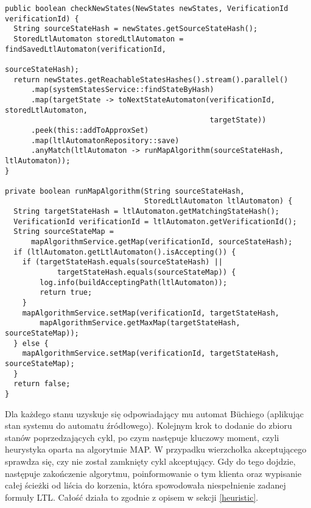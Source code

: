 \begin{minipage}{\linewidth}
\begin{lstlisting}[caption={Implementacja heurystyki pozwalającej na weryfikację modelową w locie.},captionpos=b,label={lst:checkNewStates}]
public boolean checkNewStates(NewStates newStates, VerificationId verificationId) {
  String sourceStateHash = newStates.getSourceStateHash();
  StoredLtlAutomaton storedLtlAutomaton = findSavedLtlAutomaton(verificationId,
                                                                sourceStateHash);
  return newStates.getReachableStatesHashes().stream().parallel()
      .map(systemStatesService::findStateByHash)
      .map(targetState -> toNextStateAutomaton(verificationId, storedLtlAutomaton,
                                               targetState))
      .peek(this::addToApproxSet)
      .map(ltlAutomatonRepository::save)
      .anyMatch(ltlAutomaton -> runMapAlgorithm(sourceStateHash, ltlAutomaton));
}

private boolean runMapAlgorithm(String sourceStateHash,
                                StoredLtlAutomaton ltlAutomaton) {
  String targetStateHash = ltlAutomaton.getMatchingStateHash();
  VerificationId verificationId = ltlAutomaton.getVerificationId();
  String sourceStateMap =
      mapAlgorithmService.getMap(verificationId, sourceStateHash);
  if (ltlAutomaton.getLtlAutomaton().isAccepting()) {
    if (targetStateHash.equals(sourceStateHash) ||
            targetStateHash.equals(sourceStateMap)) {
        log.info(buildAcceptingPath(ltlAutomaton));
        return true;
    }
    mapAlgorithmService.setMap(verificationId, targetStateHash,
        mapAlgorithmService.getMaxMap(targetStateHash, sourceStateMap));
  } else {
    mapAlgorithmService.setMap(verificationId, targetStateHash, sourceStateMap);
  }
  return false;
}

\end{lstlisting}
\end{minipage}

Dla każdego stanu uzyskuje się odpowiadający mu automat Büchiego (aplikując stan systemu do automatu źródłowego).
Kolejnym krok to dodanie do zbioru stanów poprzedzających cykl, po czym następuje kluczowy moment, czyli heurystyka oparta na algorytmie MAP.
W przypadku wierzchołka akceptującego sprawdza się, czy nie został zamknięty cykl akceptujący.
Gdy do tego dojdzie, następuje zakończenie algorytmu, poinformowanie o tym klienta oraz wypisanie całej ścieżki od liścia do korzenia, która spowodowała niespełnienie zadanej formuły LTL. Całość działa to zgodnie z opisem w sekcji \ref{heuristic}.

